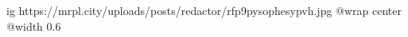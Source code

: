  
 
 
 
 

\ifcmt
  ig https://mrpl.city/uploads/posts/redactor/rfp9pysophesypvh.jpg
  @wrap center
  @width 0.6
\fi

